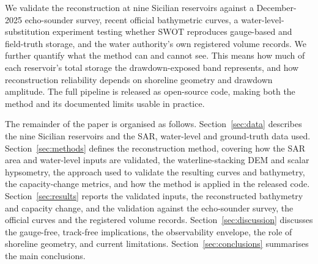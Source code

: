 We validate the reconstruction at nine Sicilian reservoirs against a
December-2025 echo-sounder survey, recent official bathymetric curves, a
water-level-substitution experiment testing whether SWOT reproduces gauge-based and
field-truth storage, and the water authority's own registered volume records. We further
quantify what the method can and cannot see. This means how much of each reservoir's total
storage the drawdown-exposed band represents, and how reconstruction reliability depends
on shoreline geometry and drawdown amplitude. The full pipeline is released as open-source
code, making both the method and its documented limits usable in practice.

The remainder of the paper is organised as follows. Section~\ref{sec:data} describes the
nine Sicilian reservoirs and the SAR, water-level and ground-truth data used.
Section~\ref{sec:methods} defines the reconstruction method, covering how the SAR area and
water-level inputs are validated, the waterline-stacking DEM and scalar hypsometry, the
approach used to validate the resulting curves and bathymetry, the capacity-change metrics,
and how the method is applied in the released code. Section~\ref{sec:results} reports the
validated inputs, the reconstructed bathymetry and capacity change, and the validation
against the echo-sounder survey, the official curves and the registered volume records.
Section~\ref{sec:discussion} discusses the gauge-free, track-free implications, the
observability envelope, the role of shoreline geometry, and current limitations.
Section~\ref{sec:conclusions} summarises the main conclusions.
